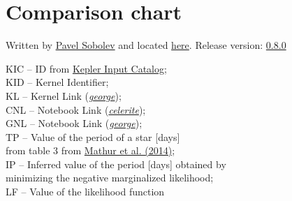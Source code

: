 \documentclass[12pt]{article}
\newcommand{\blank}[1]{\hspace*{#1}}
\begin{document}
\pagestyle{empty}

\section*{\hypertarget{sec:comparison}{Comparison chart}}

\fontsize{5}{4}\selectfont Written by \href{https://github.com/Paveloom/}{Pavel Sobolev} and located \href{https://github.com/Paveloom/C2}{here}. Release version: \href{https://github.com/Paveloom/C2/releases/tag/v0.8.0}{0.8.0} \par
\vspace{3pt}


\fontsize{4}{3}\selectfont
KIC -- ID from \href{https://archive.stsci.edu/kepler/data_search/search.php}{Kepler Input Catalog}; \\
KID -- Kernel Identifier; \\
KL -- Kernel Link (\href{https://george.readthedocs.io/en/latest/}{\textit{george}}); \\
CNL -- Notebook Link (\href{https://celerite.readthedocs.io/}{\textit{celerite}}); \\
GNL -- Notebook Link (\href{https://george.readthedocs.io/en/latest/}{\textit{george}}); \\
TP -- Value of the period of a star [days] \\
\blank{12pt} from table 3 from \href{https://paveloom.github.io/Paveloom/Repositories/C2/2/Mathur%20et%20al.%20(2014).pdf}{Mathur et al. (2014)}; \\
IP -- Inferred value of the period [days] obtained by \\
\blank{10pt} minimizing the negative marginalized likelihood; \\
LF -- Value of the likelihood function \par

\vspace{5pt}
\end{document}
